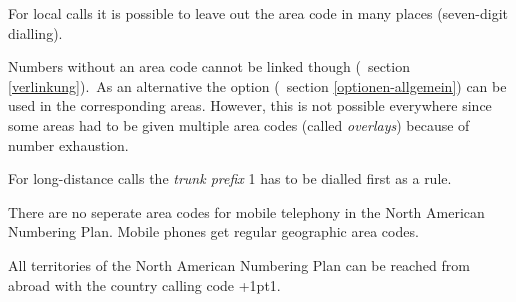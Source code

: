 \documentclass[numbers=noenddot]{scrreprt}
\newcommand\KeineVerlinkung{Numbers without an area code cannot be linked though
\vglAbschnitt{verlinkung}.}
\newcommand*\vglAbschnitt[1]{(\cf\ section \ref{#1})}
\begin{document}
For local calls it is possible to leave out the area code in many places (seven-digit dialling).
\begin{sidebyside}
\end{sidebyside}
\KeineVerlinkung\ As an alternative the  option
\vglAbschnitt{optionen-allgemein} can be used in the corresponding areas. However, this is not possible everywhere \cite{NANPA-ten-digit} since some areas had to be given multiple area codes (called \emph{overlays}) because of number exhaustion.

For long-distance calls the \emph{trunk prefix} 1 has to be dialled first as a rule.
\begin{sidebyside}
\end{sidebyside}

There are no seperate area codes for mobile telephony in the North American Numbering Plan. Mobile phones get regular geographic area codes.

All territories of the North American Numbering Plan can be reached from abroad with the country calling code +\kern1pt1.
\begin{sidebyside}
\end{sidebyside}
\end{document}
